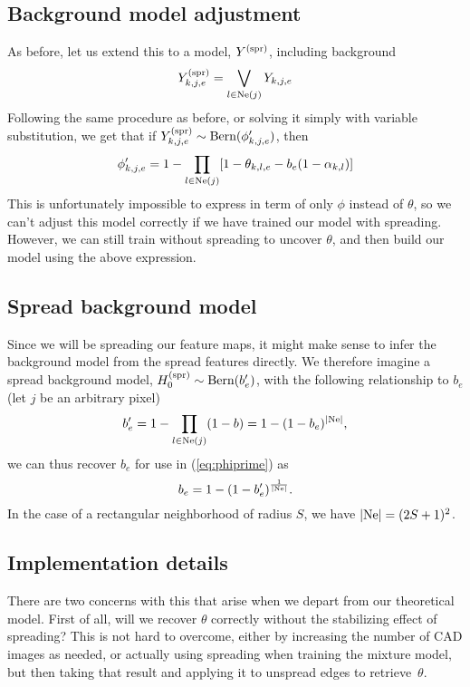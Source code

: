 \documentclass{article}
\newcommand{\Bern}[1]{\text{Bern}(#1)}
\begin{document}
\subsection{Background model adjustment}
As before, let us extend this to a model, $Y^{\text{(spr)}}$, including background
\[
    Y^{\text{(spr)}}_{k,j,e} = \bigvee_{l \in \text{Ne}(j)} Y_{k,j,e}
\]
Following the same procedure as before, or solving it simply with variable substitution, we get that if $\spr{Y}_{k,j,e} \sim \Bern{\phi'_{k,j,e}}$, then
\begin{equation} \label{eq:phiprime}
    \phi'_{k,j,e} = 1 - \prod_{l \in \text{Ne}(j)} [1 - \theta_{k,l,e} - b_e (1 - \alpha_{k,l})]
\end{equation}
This is unfortunately impossible to express in term of only $\phi$ instead of $\theta$, so we can't adjust this model correctly if we have trained our model with spreading. However, we can still train without spreading to uncover $\theta$, and then build our model using the above expression.

\subsection{Spread background model}
Since we will be spreading our feature maps, it might make sense to infer the background model from the spread features directly. We therefore imagine a spread background model, $\spr{H_0} \sim \Bern{b'_e}$, with the following relationship to $b_e$ (let $j$ be an arbitrary pixel)
\[
    b'_e = 1 - \prod_{l \in \text{Ne}(j)} (1 - b) = 1 - (1 - b_e)^{|\text{Ne}|},
\]
we can thus recover $b_e$ for use in (\ref{eq:phiprime}) as
\[
    b_e = 1 - (1 - b'_e)^{\frac{1}{|\text{Ne}|}}.
\]
In the case of a rectangular neighborhood of radius $S$, we have $|\text{Ne}| = (2S + 1)^2$.


\subsection{Implementation details}
There are two concerns with this that arise when we depart from our theoretical model. First of all, will we recover $\theta$ correctly without the stabilizing effect of spreading? This is not hard to overcome, either by increasing the number of CAD images as needed, or actually using spreading when training the mixture model, but then taking that result and applying it to unspread edges to retrieve~$\theta$. 
\end{document}
